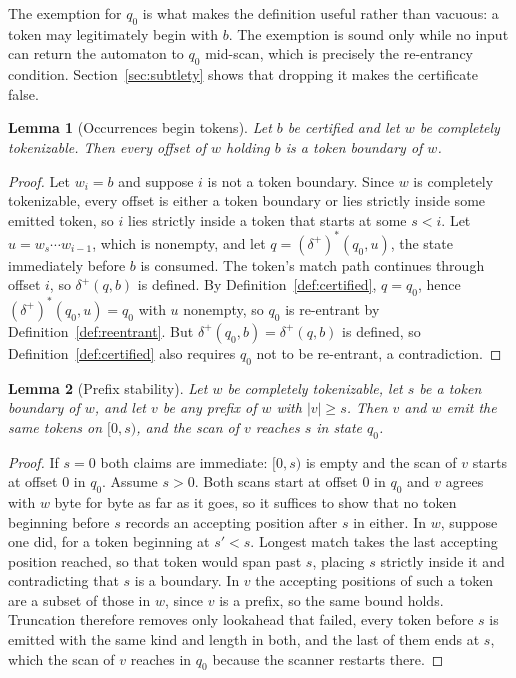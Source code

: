\documentclass[11pt,a4paper]{article}
\theoremstyle{definition}
\theoremstyle{plain}
\newtheorem{lemma}{Lemma}
\begin{document}
The exemption for $q_0$ is what makes the definition useful rather than vacuous: a token may legitimately begin with
$b$. The exemption is sound only while no input can return the automaton to $q_0$ mid-scan, which is precisely the
re-entrancy condition. Section~\ref{sec:subtlety} shows that dropping it makes the certificate false.

\begin{lemma}[Occurrences begin tokens]
\label{lem:boundary}
Let $b$ be certified and let $w$ be completely tokenizable. Then every offset of $w$ holding $b$ is a token boundary
of $w$.
\end{lemma}

\begin{proof}
Let $w_i = b$ and suppose $i$ is not a token boundary. Since $w$ is completely tokenizable, every offset is either a
token boundary or lies strictly inside some emitted token, so $i$ lies strictly inside a token that starts at some $s
< i$. Let $u = w_s \cdots w_{i-1}$, which is nonempty, and let $q = (\delta^+)^*(q_0, u)$, the state immediately
before $b$ is consumed. The token's match path continues through offset $i$, so $\delta^+(q, b)$ is defined. By
Definition~\ref{def:certified}, $q = q_0$, hence $(\delta^+)^*(q_0, u) = q_0$ with $u$ nonempty, so $q_0$ is
re-entrant by Definition~\ref{def:reentrant}. But $\delta^+(q_0, b) = \delta^+(q, b)$ is defined, so
Definition~\ref{def:certified} also requires $q_0$ not to be re-entrant, a contradiction.
\end{proof}

\begin{lemma}[Prefix stability]
\label{lem:truncation}
Let $w$ be completely tokenizable, let $s$ be a token boundary of $w$, and let $v$ be any prefix of $w$ with $|v| \geq
s$. Then $v$ and $w$ emit the same tokens on $[0, s)$, and the scan of $v$ reaches $s$ in state $q_0$.
\end{lemma}

\begin{proof}
If $s = 0$ both claims are immediate: $[0, s)$ is empty and the scan of $v$ starts at offset $0$ in $q_0$. Assume $s >
0$. Both scans start at offset $0$ in $q_0$ and $v$ agrees with $w$ byte for byte as far as it goes, so it suffices to
show that no token beginning before $s$ records an accepting position after $s$ in either. In $w$, suppose one did, for
a token beginning at $s' < s$. Longest match takes the last accepting position reached, so that token would span past
$s$, placing $s$ strictly inside it and contradicting that $s$ is a boundary. In $v$ the accepting positions of such a
token are a subset of those in $w$, since $v$ is a prefix, so the same bound holds. Truncation therefore removes only
lookahead that failed, every token before $s$ is emitted with the same kind and length in both, and the last of them
ends at $s$, which the scan of $v$ reaches in $q_0$ because the scanner restarts there.
\end{proof}
\end{document}
